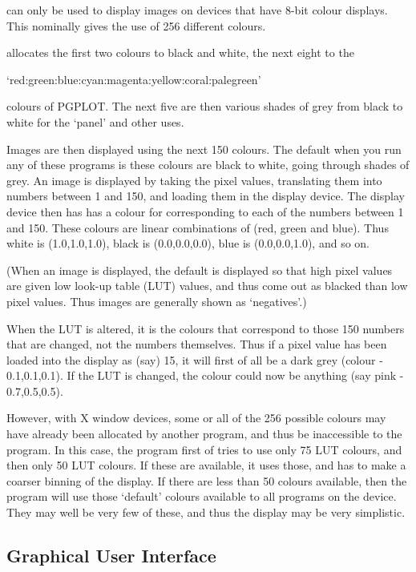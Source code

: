 \starman can only be used to display images on devices that have 8-bit
colour displays. This nominally gives the use of 256 different
colours.

\starman allocates the first two colours to black and white, the next
eight to the

`red:green:blue:cyan:magenta:yellow:coral:palegreen'

colours of PGPLOT. The next five are then various shades of grey from
black to white for the `panel' and other uses.

Images are then displayed using the next 150 colours. The default when
you run any of these programs is these colours are black to white,
going through shades of grey. An image is displayed by taking the pixel
values, translating them into numbers between 1 and 150, and loading
them in the display device. The display device then has has a colour
for corresponding to each of the numbers between 1 and 150. These
colours are linear combinations of (red, green and blue).  Thus white
is (1.0,1.0,1.0), black is (0.0,0.0,0.0), blue is (0.0,0.0,1.0), and so
on.

(When an image is displayed, the default is displayed so that high
pixel values are given low look-up table (LUT) values, and thus come
out as blacked than low pixel values. Thus images are generally shown
as `negatives'.)

When the LUT is altered, it is the colours that correspond to those 150
numbers that are changed, not the numbers themselves. Thus if a pixel
value has been loaded into the display as (say) 15, it will first of
all be a dark grey (colour - 0.1,0.1,0.1). If the LUT is changed, the
colour could now be anything (say pink - 0.7,0.5,0.5).

However, with X window devices, some or all of the 256 possible colours
may have already been allocated by another program, and thus be
inaccessible to the \starman program. In this case, the \starman
program first of tries to use only 75 LUT colours, and then only 50 LUT
colours. If these are available, it uses those, and has to make a
coarser binning of the display.  If there are less than 50 colours
available, then the program will use those `default' colours available
to all programs on the device. They may well be very few of these, and
thus the display may be very simplistic.

\subsection{Graphical User Interface} \label{se:advance}

